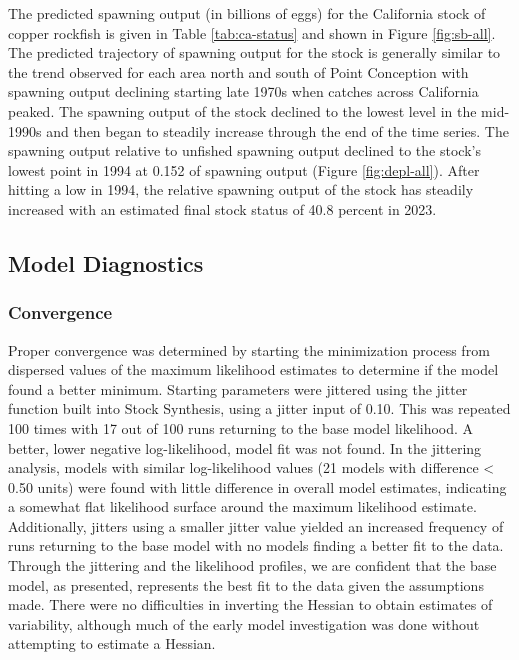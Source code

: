 \documentclass[11pt,
  english,
  letterpaper,
]{article}
\begin{document}
The predicted spawning output (in billions of eggs) for the California stock of copper rockfish is given in Table \ref{tab:ca-status} and shown in Figure \ref{fig:sb-all}. The predicted trajectory of spawning output for the stock is generally similar to the trend observed for each area north and south of Point Conception with spawning output declining starting late 1970s when catches across California peaked. The spawning output of the stock declined to the lowest level in the mid-1990s and then began to steadily increase through the end of the time series. The spawning output relative to unfished spawning output declined to the stock's lowest point in 1994 at 0.152 of spawning output (Figure \ref{fig:depl-all}). After hitting a low in 1994, the relative spawning output of the stock has steadily increased with an estimated final stock status of 40.8 percent in 2023.

\hypertarget{model-diagnostics}{%
\subsection{Model Diagnostics}\label{model-diagnostics}}

\hypertarget{convergence}{%
\subsubsection{Convergence}\label{convergence}}

Proper convergence was determined by starting the minimization process from dispersed values of the maximum likelihood estimates to determine if the model found a better minimum. Starting parameters were jittered using the jitter function built into Stock Synthesis, using a jitter input of 0.10. This was repeated 100 times with 17 out of 100 runs returning to the base model likelihood. A better, lower negative log-likelihood, model fit was not found. In the jittering analysis, models with similar log-likelihood values (21 models with difference \textless{} 0.50 units) were found with little difference in overall model estimates, indicating a somewhat flat likelihood surface around the maximum likelihood estimate. Additionally, jitters using a smaller jitter value yielded an increased frequency of runs returning to the base model with no models finding a better fit to the data. Through the jittering and the likelihood profiles, we are confident that the base model, as presented, represents the best fit to the data given the assumptions made. There were no difficulties in inverting the Hessian to obtain estimates of variability, although much of the early model investigation was done without attempting to estimate a Hessian.
\end{document}
